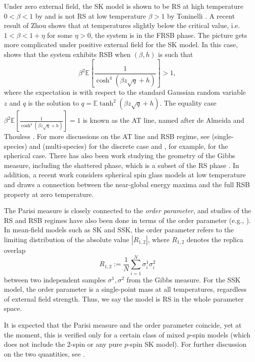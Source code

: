 \documentclass[11pt]{article}
\numberwithin{equation}{section}
\def \b {\beta}
\def \s {\sigma}
\newcommand{\bE}{\mathbb{E}}
\theoremstyle{remark}
\begin{document}
Under zero external field, the SK model is shown to be RS at high temperature $0<\b <1$ by \cite{AizenmanLebowitzRuelle} and is not RS at low temperature $\b>1$ by Toninelli \cite{Toninelli_2002}. A recent result of Zhou \cite{Zhou25} shows that at temperatures slightly below the critical value, i.e. $1 < \b <1 +\eta$ for some $\eta>0$, the system is in the FRSB phase. The picture gets more complicated under positive external field for the SK model. In this case, \cite{Toninelli_2002} shows that the system exhibits RSB when $(\b, h)$ is such that
\[
\b^2 \bE \left[\frac1{\cosh^4(\b z\sqrt{q} +h)}\right]>1,
\]
where the expectation is with respect to the standard Gaussian random variable $z$ and $q$ is the solution to $q = \bE \tanh^2(\b z\sqrt{q} +h)$. The equality case $
\b^2 \bE \left[\frac1{\cosh^4(\b z\sqrt{q} +h)}\right]=1$ is known as the AT line, named after de Almeida and Thouless \cite{dAT_1978}. For more discussions on the AT line and RSB regime, see \cites{Toninelli_2002,JT_2017,BY_2022, Bolthausen14, Bolthausen19} (single-species) and \cites{BatesSlomanSohn19, DeyWu21, Kim25} (multi-species) for the discrete case and \cite{JT_2018,BatesSohn22b}, for example, for the spherical case. There has also been work studying the geometry of the Gibbs measure, including the shattered phase, which is a subset of the RS phase \cite{Subag_2017, BAJ_2024, GJK_2025, ElAMS_2025, crisanti1993spherical}. In addition, a recent work \cite{Sellke_marginalstability} considers spherical spin glass models at low temperature and draws a connection between the near-global energy maxima and the full RSB property at zero temperature.

The Parisi measure is closely connected to the \textit{order parameter}, and studies of the RS and RSB regimes have also been done in terms of the order parameter (e.g., \cites{BatesSlomanSohn19}). In mean-field models such as SK and SSK, the order parameter refers to the limiting distribution of the absolute value $|R_{1,2}|$, where $R_{1,2}$ denotes the replica overlap
\[
R_{1,2} := \frac1N \sum_{i=1}^N \s^1_i\s^2_i
\]
between two independent samples $\s^1, \s^2$ from the Gibbs measure. For the SSK model, the order parameter is a single-point mass at all temperatures, regardless of external field strength. Thus, we say the model is RS in the whole parameter space. 

It is expected that the Parisi measure and the order parameter coincide, yet at the moment, this is verified only for a certain class of mixed $p$-spin models (which does not include the 2-spin or any pure $p$-spin SK model). For further discussion on the two quantities, see \cite{AC15, AC15_unique, ACZ_2020}.
\end{document}
